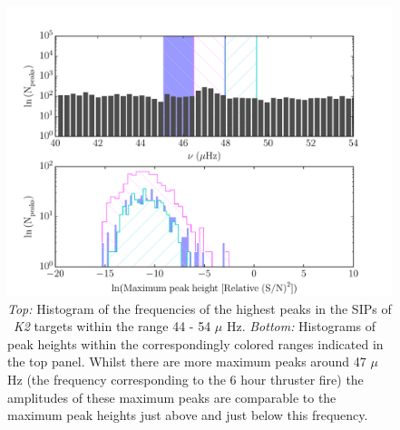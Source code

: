 \documentclass[useAMS, usenatbib, preprint, 12pt]{aastex}
\begin{document}
\begin{figure}
\begin{center}
\includegraphics[width=6in, clip=true]{sip_hist.pdf}
\caption{{\it Top:} Histogram of the frequencies of the highest peaks in the
	SIPs of \nGO\ {\it K2}
	targets within the range 44 - 54 $\mu$ Hz. {\it Bottom:} Histograms of
	peak heights within the correspondingly colored ranges indicated in the
	top panel.
	Whilst there are more maximum peaks around 47 $\mu$ Hz (the frequency
	corresponding to the 6 hour thruster fire) the amplitudes of these
	maximum peaks are comparable to the maximum peak heights just above
	and just below this frequency.}
\label{fig:sip_hist}
\end{center}
\end{figure}
\end{document}
